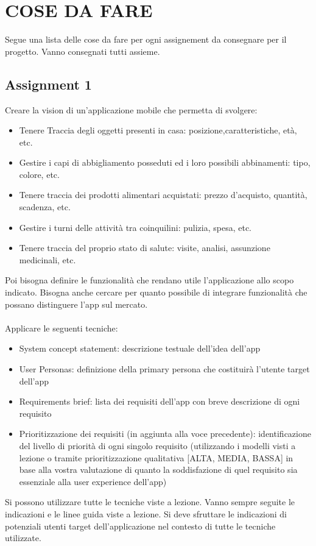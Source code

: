 \section{COSE DA FARE}
Segue una lista delle cose da fare per ogni assignement da consegnare per il progetto.
Vanno consegnati tutti assieme.

\subsection{Assignment 1}
Creare la vision di un'applicazione mobile che permetta di svolgere:
\begin{itemize}
    \item Tenere Traccia degli oggetti presenti in casa: posizione,caratteristiche, età, etc.
    \item Gestire i capi di abbigliamento posseduti ed i loro possibili abbinamenti: tipo, colore, etc.
    \item Tenere traccia dei prodotti alimentari acquistati: prezzo d'acquisto, quantità, scadenza, etc.
    \item Gestire i turni delle attività tra coinquilini: pulizia, spesa, etc.
    \item Tenere traccia del proprio stato di salute: visite, analisi, assunzione medicinali, etc.
\end{itemize}

Poi bisogna definire le funzionalità che rendano utile l'applicazione allo scopo indicato. 
Bisogna anche cercare per quanto possibile di integrare funzionalità che possano distinguere l'app sul mercato.\\\\

\noindent Applicare le seguenti tecniche:
\begin{itemize}
    \item System concept statement: descrizione testuale dell'idea dell'app
    \item User Personas: definizione della primary persona che costituirà l'utente target dell'app
    \item Requirements brief: lista dei requisiti dell'app con breve descrizione di ogni requisito
    \item Prioritizzazione dei requisiti (in aggiunta alla voce precedente): identificazione del livello di priorità di ogni singolo requisito (utilizzando i modelli visti a lezione o tramite prioritizzazione qualitativa [ALTA, MEDIA, BASSA] in base alla vostra valutazione di quanto la soddisfazione di quel requisito sia essenziale alla user experience dell'app)
\end{itemize}
\noindent Si possono utilizzare tutte le tecniche viste a lezione.
Vanno sempre seguite le indicazioni e le linee guida viste a lezione.
Si deve sfruttare le indicazioni di potenziali utenti target dell'applicazione nel contesto di tutte le tecniche utilizzate. \\ \\

